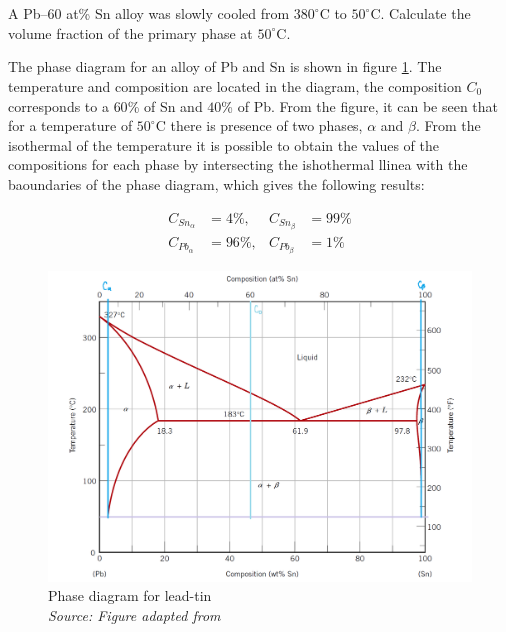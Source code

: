 \section{}

\subsection{}
A Pb–$60$ at\% Sn alloy was slowly cooled from $380^{\circ}$C to $50^{\circ}$C. Calculate the volume fraction of the primary phase at $50^{\circ}$C.

The phase diagram for an alloy of Pb and Sn is shown in figure \ref{fig:diagrama}. The temperature and composition are located in the diagram, the composition $C_0$ corresponds to a $60$\% of Sn and $40$\% of Pb. From the figure, it can be seen that for a temperature of $50^{\circ}$C there is presence of two phases, $\alpha$ and $\beta$. From the isothermal of the temperature it is possible to obtain the values of the compositions for each phase by intersecting the ishothermal llinea with the baoundaries of the phase diagram, which gives the following results:

\begin{align*}
    C_{Sn_{\alpha}}&=4\%, & C_{Sn_{\beta}}&=99\% \\
    C_{Pb_{\alpha}}&=96\%, & C_{Pb_{\beta}}&=1\%
\end{align*}

\begin{figure}[h]
    \centering
    \includegraphics[width=1\textwidth]{graficas/diagrama.png}
    \caption{Phase diagram for lead-tin \\
    \textit{Source: Figure adapted from \citep{callister2010materials}}}
    \label{fig:diagrama}
\end{figure}

